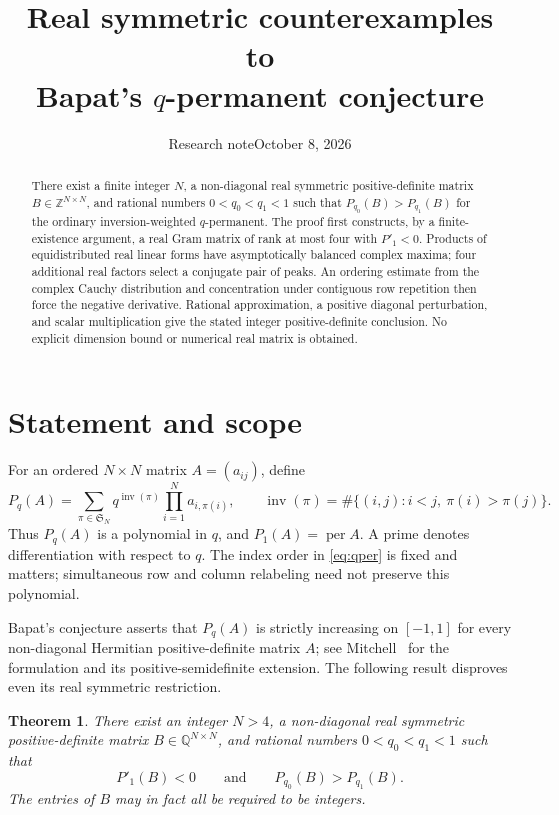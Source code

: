 \documentclass[11pt]{article}
\title{Real symmetric counterexamples to\protect\\Bapat's $q$-permanent conjecture}
\author{}
\date{Research note\quad October 8, 2026}
\newtheorem{theorem}{Theorem}
\theoremstyle{remark}
\DeclareMathOperator{\per}{per}
\DeclareMathOperator{\inv}{inv}
\newcommand{\Q}{\mathbb Q}
\newcommand{\Z}{\mathbb Z}
\begin{document}
\maketitle
\begin{abstract}
There exist a finite integer $N$, a non-diagonal real symmetric positive-definite matrix $B\in\Z^{N\times N}$, and rational numbers $0<q_0<q_1<1$ such that $P_{q_0}(B)>P_{q_1}(B)$ for the ordinary inversion-weighted $q$-permanent. The proof first constructs, by a finite-existence argument, a real Gram matrix of rank at most four with $P'_1<0$. Products of equidistributed real linear forms have asymptotically balanced complex maxima; four additional real factors select a conjugate pair of peaks. An ordering estimate from the complex Cauchy distribution and concentration under contiguous row repetition then force the negative derivative. Rational approximation, a positive diagonal perturbation, and scalar multiplication give the stated integer positive-definite conclusion. No explicit dimension bound or numerical real matrix is obtained.
\end{abstract}

\section{Statement and scope}
For an ordered $N\times N$ matrix $A=(a_{ij})$, define
\begin{equation}\label{eq:qper}
 P_q(A)=\sum_{\pi\in\mathfrak S_N}q^{\inv(\pi)}
             \prod_{i=1}^N a_{i,\pi(i)},\qquad
 \inv(\pi)=\#\{(i,j):i<j,\ \pi(i)>\pi(j)\}.
\end{equation}
Thus $P_q(A)$ is a polynomial in $q$, and $P_1(A)=\per A$. A prime denotes differentiation with respect to $q$. The index order in \eqref{eq:qper} is fixed and matters; simultaneous row and column relabeling need not preserve this polynomial.

Bapat's conjecture asserts that $P_q(A)$ is strictly increasing on $[-1,1]$ for every non-diagonal Hermitian positive-definite matrix $A$; see Mitchell~\cite{Mitchell} for the formulation and its positive-semidefinite extension. The following result disproves even its real symmetric restriction.

\begin{theorem}\label{thm:main}
There exist an integer $N>4$, a non-diagonal real symmetric positive-definite matrix $B\in\Q^{N\times N}$, and rational numbers $0<q_0<q_1<1$ such that
\[
 P'_1(B)<0\qquad\text{and}\qquad P_{q_0}(B)>P_{q_1}(B).
\]
The entries of $B$ may in fact all be required to be integers.
\end{theorem}
\end{document}
